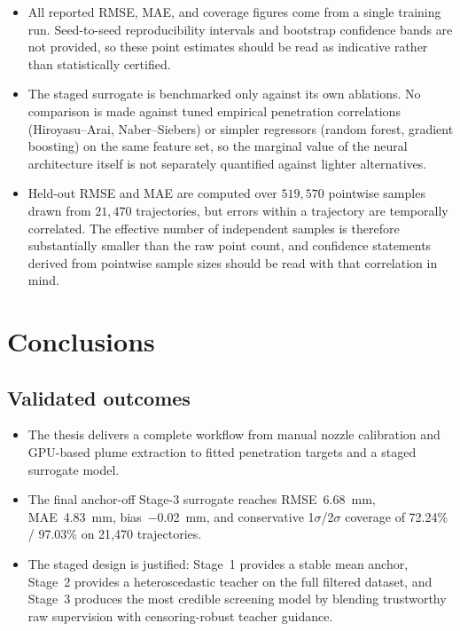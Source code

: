\documentclass[english, 12pt, a4paper, elec, utf8, a-2b, online]{aaltothesis}
\begin{document}
\begin{itemize}
  \item All reported RMSE, MAE, and coverage figures come from a single training run. Seed-to-seed reproducibility intervals and bootstrap confidence bands are not provided, so these point estimates should be read as indicative rather than statistically certified.
  \item The staged surrogate is benchmarked only against its own ablations. No comparison is made against tuned empirical penetration correlations (Hiroyasu--Arai, Naber--Siebers) or simpler regressors (random forest, gradient boosting) on the same feature set, so the marginal value of the neural architecture itself is not separately quantified against lighter alternatives.
  \item Held-out RMSE and MAE are computed over $519{,}570$ pointwise samples drawn from $21{,}470$ trajectories, but errors within a trajectory are temporally correlated. The effective number of independent samples is therefore substantially smaller than the raw point count, and confidence statements derived from pointwise sample sizes should be read with that correlation in mind.
\end{itemize}

\section{Conclusions}

\subsection{Validated outcomes}

\begin{itemize}
  \item The thesis delivers a complete workflow from manual nozzle calibration and GPU-based plume extraction to fitted penetration targets and a staged surrogate model.
  \item The final anchor-off Stage-3 surrogate reaches RMSE~\SI{6.68}{mm}, MAE~\SI{4.83}{mm}, bias~\SI{-0.02}{mm}, and conservative 1$\sigma$/2$\sigma$ coverage of 72.24\% / 97.03\% on 21{,}470 trajectories.
  \item The staged design is justified: Stage~1 provides a stable mean anchor, Stage~2 provides a heteroscedastic teacher on the full filtered dataset, and Stage~3 produces the most credible screening model by blending trustworthy raw supervision with censoring-robust teacher guidance.
\end{itemize}
\end{document}
